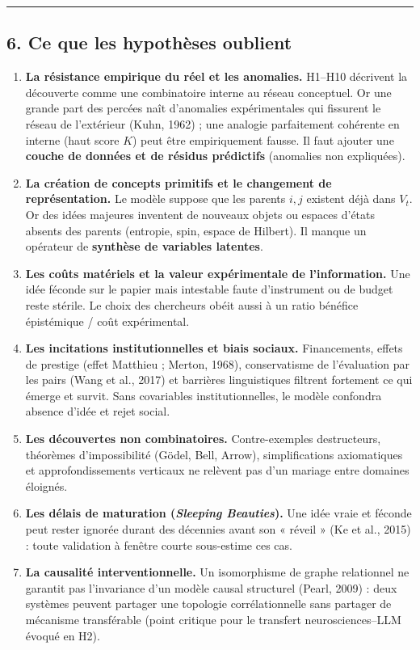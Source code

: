\documentclass[a4paper,11pt]{article}
\providecommand{\tightlist}{\setlength{\itemsep}{0pt}\setlength{\parskip}{0pt}}
\begin{document}
\begin{center}\rule{0.5\linewidth}{0.5pt}\end{center}

\subsection*{6. Ce que les hypothèses oublient}

\begin{enumerate}
\def\labelenumi{\arabic{enumi}.}
\tightlist
\item
  \textbf{La résistance empirique du réel et les anomalies.} H1--H10
  décrivent la découverte comme une combinatoire interne au réseau
  conceptuel. Or une grande part des percées naît d'anomalies
  expérimentales qui fissurent le réseau de l'extérieur (Kuhn, 1962) ;
  une analogie parfaitement cohérente en interne (haut score \(K\)) peut
  être empiriquement fausse. Il faut ajouter une \textbf{couche de
  données et de résidus prédictifs} (anomalies non expliquées).
\item
  \textbf{La création de concepts primitifs et le changement de
  représentation.} Le modèle suppose que les parents \(i, j\) existent
  déjà dans \(V_t\). Or des idées majeures inventent de nouveaux objets
  ou espaces d'états absents des parents (entropie, spin, espace de
  Hilbert). Il manque un opérateur de \textbf{synthèse de variables
  latentes}.
\item
  \textbf{Les coûts matériels et la valeur expérimentale de
  l'information.} Une idée féconde sur le papier mais intestable faute
  d'instrument ou de budget reste stérile. Le choix des chercheurs obéit
  aussi à un ratio bénéfice épistémique / coût expérimental.
\item
  \textbf{Les incitations institutionnelles et biais sociaux.}
  Financements, effets de prestige (effet Matthieu ; Merton, 1968),
  conservatisme de l'évaluation par les pairs (Wang et al., 2017) et
  barrières linguistiques filtrent fortement ce qui émerge et survit.
  Sans covariables institutionnelles, le modèle confondra absence d'idée
  et rejet social.
\item
  \textbf{Les découvertes non combinatoires.} Contre-exemples
  destructeurs, théorèmes d'impossibilité (Gödel, Bell, Arrow),
  simplifications axiomatiques et approfondissements verticaux ne
  relèvent pas d'un mariage entre domaines éloignés.
\item
  \textbf{Les délais de maturation (\emph{Sleeping Beauties}).} Une idée
  vraie et féconde peut rester ignorée durant des décennies avant son «
  réveil » (Ke et al., 2015) : toute validation à fenêtre courte
  sous-estime ces cas.
\item
  \textbf{La causalité interventionnelle.} Un isomorphisme de graphe
  relationnel ne garantit pas l'invariance d'un modèle causal structurel
  (Pearl, 2009) : deux systèmes peuvent partager une topologie
  corrélationnelle sans partager de mécanisme transférable (point
  critique pour le transfert neurosciences--LLM évoqué en H2).
\end{enumerate}
\end{document}
